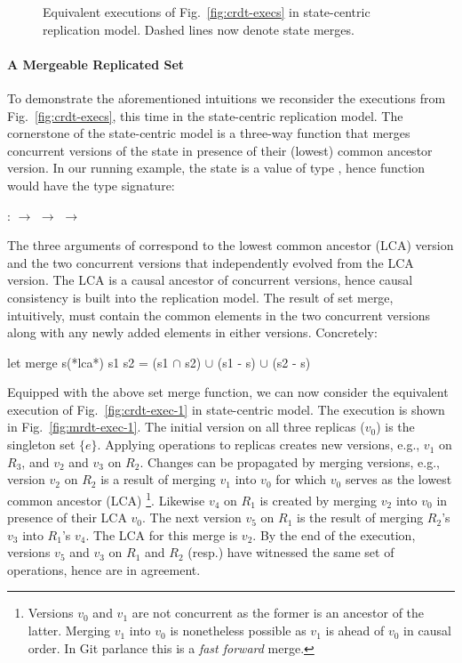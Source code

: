 \begin{figure}[ht]
\begin{subfigure}[t]{0.44\columnwidth}
    \caption{}
    \label{fig:mrdt-exec-2}
  \end{subfigure}
\caption{Equivalent executions of Fig.~\ref{fig:crdt-execs} in
state-centric replication model. Dashed lines now denote state merges.}
\label{fig:mrdt-execs}
\end{figure}

\noindent\paragraph{A Mergeable Replicated Set} To demonstrate the
aforementioned intuitions we reconsider the executions from
Fig.~\ref{fig:crdt-execs}, this time in the state-centric replication
model. The cornerstone of the state-centric model is a three-way
 function that merges concurrent versions of the state in
presence of their (lowest) common ancestor version. In our running
example, the state is a value of type , hence 
function would have the type signature:
\begin{center}
 :  $\rightarrow$  $\rightarrow$ 
$\rightarrow$ 
\end{center}
The three arguments of  correspond to the lowest common
ancestor (LCA) version and the two concurrent versions that
independently evolved from the LCA version. The LCA is a causal
ancestor of concurrent versions, hence causal consistency is built
into the replication model. The result of set merge, intuitively, must
contain the common elements in the two concurrent versions along with
any newly added elements in either versions. Concretely:
\begin{ocaml}
  let merge s(*lca*) s1 s2 = 
              (s1 $\cap$ s2) $\cup$ (s1 - s) $\cup$ (s2 - s)
\end{ocaml}
Equipped with the above set merge function, we can now consider the
equivalent execution of Fig.~\ref{fig:crdt-exec-1} in state-centric
model. The execution is shown in Fig.~\ref{fig:mrdt-exec-1}. The
initial version on all three replicas ($v_0$) is the singleton set
$\{e\}$. Applying operations to replicas creates new versions, e.g.,
$v_1$ on $R_3$, and $v_2$ and $v_3$ on $R_2$. Changes can be propagated by merging versions, e.g.,
version $v_2$ on $R_2$ is a result of merging $v_1$ into $v_0$ for
which $v_0$ serves as the lowest common ancestor (LCA)
  \footnote{Versions $v_0$ and $v_1$ are not concurrent as the
  former is an ancestor of the latter. Merging $v_1$ into $v_0$ is
  nonetheless possible as $v_1$ is ahead of $v_0$ in causal order. In
  Git parlance this is a \emph{fast forward} merge.}.
Likewise $v_4$ on $R_1$ is created by merging $v_2$ into $v_0$ in
presence of their LCA $v_0$. The next version $v_5$ on $R_1$ is the
result of merging $R_2$'s $v_3$ into $R_1$'s $v_4$. The LCA for this
merge is $v_2$. By the end of the execution, versions $v_5$ and $v_3$
on $R_1$ and $R_2$ (resp.) have witnessed the same set of operations,
hence are in agreement.


